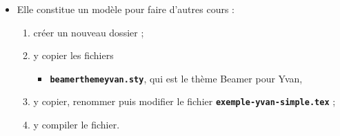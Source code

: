   \begin{itemize}
  \item Elle constitue un modèle pour faire d'autres cours :
      
    \begin{enumerate}
    \item créer un nouveau dossier ;
    \item y copier les fichiers 
      
      \begin{itemize}
      \item \texttt{\textbf{beamerthemeyvan.sty}}, qui est le thème Beamer pour Yvan,
      \end{itemize}
      
    \item y copier, renommer puis modifier le fichier \texttt{\textbf{exemple-yvan-simple.tex}} ;
    \item y compiler le fichier.
    \end{enumerate}
  \end{itemize}
